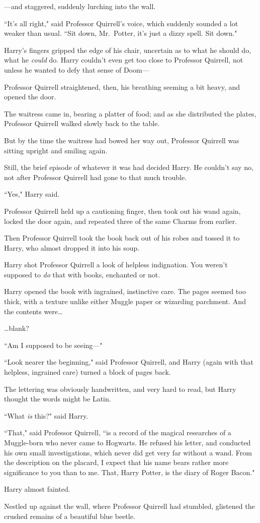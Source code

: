 ---and staggered, suddenly lurching into the wall.

``It's all right," said Professor Quirrell's voice, which suddenly sounded a lot weaker than usual. ``Sit down, Mr.~Potter, it's just a dizzy spell. Sit down."

Harry's fingers gripped the edge of his chair, uncertain as to what he should do, what he \emph{could} do. Harry couldn't even get too close to Professor Quirrell, not unless he wanted to defy that sense of Doom---

Professor Quirrell straightened, then, his breathing seeming a bit heavy, and opened the door.

The waitress came in, bearing a platter of food; and as she distributed the plates, Professor Quirrell walked slowly back to the table.

But by the time the waitress had bowed her way out, Professor Quirrell was sitting upright and smiling again.

Still, the brief episode of whatever it was had decided Harry. He couldn't say no, not after Professor Quirrell had gone to that much trouble.

``Yes," Harry said.

Professor Quirrell held up a cautioning finger, then took out his wand again, locked the door again, and repeated three of the same Charms from earlier.

Then Professor Quirrell took the book back out of his robes and tossed it to Harry, who almost dropped it into his soup.

Harry shot Professor Quirrell a look of helpless indignation. You weren't supposed to \emph{do} that with books, enchanted or not.

Harry opened the book with ingrained, instinctive care. The pages seemed too thick, with a texture unlike either Muggle paper or wizarding parchment. And the contents were{\ldots}

{\ldots}blank?

``Am I supposed to be seeing---"

``Look nearer the beginning," said Professor Quirrell, and Harry (again with that helpless, ingrained care) turned a block of pages back.

The lettering was obviously handwritten, and very hard to read, but Harry thought the words might be Latin.

``What \emph{is} this?" said Harry.

``That," said Professor Quirrell, ``is a record of the magical researches of a Muggle-born who never came to Hogwarts. He refused his letter, and conducted his own small investigations, which never did get very far without a wand. From the description on the placard, I expect that his name bears rather more significance to you than to me. That, Harry Potter, is the diary of Roger Bacon."

Harry almost fainted.

Nestled up against the wall, where Professor Quirrell had stumbled, glistened the crushed remains of a beautiful blue beetle.

